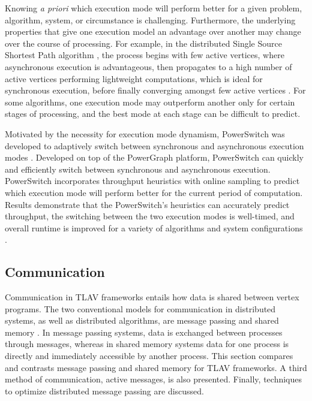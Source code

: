 \documentclass[reprint,twocolumn,showpacs,preprintnumbers,amsmath, aps,pre,amssymb]{revtex4-1}
\begin{document}
Knowing \textit{a priori} which execution mode will perform better for a given problem, algorithm, system, or circumstance is challenging.  Furthermore, the underlying properties that give one execution model an advantage over another may change over the course of processing.  For example, in the distributed Single Source Shortest Path algorithm \cite{Bertsekas1996}, the process begins with few active vertices, where asynchronous execution is advantageous, then propagates to a high number of active vertices performing lightweight computations, which is ideal for synchronous execution, before finally converging amongst few active vertices \cite{Xie2013}.  For some algorithms, one execution mode may outperform another only for certain stages of processing, and the best mode at each stage can be difficult to predict.

Motivated by the necessity for execution mode dynamism, PowerSwitch was developed to adaptively switch between synchronous and asynchronous execution modes \cite{Xie2013}.  Developed on top of the PowerGraph platform, PowerSwitch can quickly and efficiently switch between synchronous and asynchronous execution.  PowerSwitch incorporates throughput heuristics with online sampling to predict which execution mode will perform better for the current period of computation.  Results demonstrate that the PowerSwitch's heuristics can accurately predict throughput, the switching between the two execution modes is well-timed, and overall runtime is improved for a variety of algorithms and system configurations \cite{Xie2013}.

\subsection{Communication}
\label{subsec:communication}

Communication in TLAV frameworks entails how data is shared between vertex programs.  The two conventional models for communication in distributed systems, as well as distributed algorithms, are message passing and shared memory \cite{Yan2013,Lu1995,Lynch1996}.  In message passing systems, data is exchanged between processes through messages, whereas in shared memory systems data for one process is directly and immediately accessible by another process.  This section compares and contrasts message passing and shared memory for TLAV frameworks. A third method of communication, active messages, is also presented. Finally, techniques to optimize distributed message passing are discussed.
\end{document}
